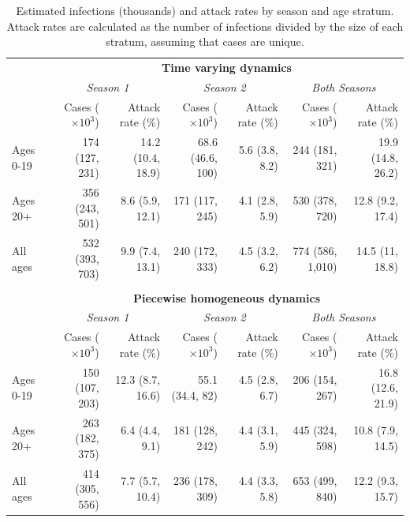 \begin{table}
	\caption[Estimated A(H1N1) infections and attack rates by season and age stratum.]{Estimated infections (thousands) and attack rates by season and age stratum. Attack rates are calculated as the number of infections divided by the size of each stratum, assuming that cases are unique.}
	\label{tab:flu_attack_rates}
	\centering\footnotesize
	\begin{tabular}{lrrrrrr}
		\hline
		&\multicolumn{6}{c}{\textbf{Time varying dynamics}}\\
		\cmidrule{2-7} & \multicolumn{2}{c}{\textit{Season 1}} & \multicolumn{2}{c}{\textit{Season 2}} & \multicolumn{2}{c}{\textit{Both Seasons}}\\
		\cmidrule(r){2-3}\cmidrule(lr){4-5}\cmidrule(l){6-7} & 
		Cases ($ \times10^3 $) & Attack rate (\%) & Cases ($ \times10^3 $)& Attack rate (\%) & Cases ($ \times10^3 $) & Attack rate (\%)\\
		\hline
	Ages 0-19 & 174 (127, 231) & 14.2 (10.4, 18.9) & 68.6 (46.6, 100) & 5.6 (3.8, 8.2) & 244 (181, 321) & 19.9 (14.8, 26.2)\\
	Ages 20+ & 356 (243, 501) & 8.6 (5.9, 12.1) & 171 (117, 245) & 4.1 (2.8, 5.9) & 530 (378, 720) & 12.8 (9.2, 17.4)\\
	All ages & 532 (393, 703) & 9.9 (7.4, 13.1) & 240 (172, 333) & 4.5 (3.2, 6.2) & 774 (586, 1,010) & 14.5 (11, 18.8)\\
		\hline &&&&&&\\
		&\multicolumn{6}{c}{\textbf{Piecewise homogeneous dynamics}}\\
		\cmidrule{2-7}	& \multicolumn{2}{c}{\textit{Season 1}} & \multicolumn{2}{c}{\textit{Season 2}} & \multicolumn{2}{c}{\textit{Both Seasons}}\\
	\cmidrule(r){2-3}\cmidrule(lr){4-5}\cmidrule(l){6-7} & 
	Cases ($ \times10^3 $) & Attack rate (\%)& Cases ($ \times10^3 $) & Attack rate (\%)& Cases ($ \times10^3 $) & Attack rate (\%)\\
	\hline
	Ages 0-19 & 150 (107, 203) & 12.3 (8.7, 16.6) & 55.1 (34.4, 82) & 4.5 (2.8, 6.7) & 206 (154, 267) & 16.8 (12.6, 21.9)\\
	Ages 20+ & 263 (182, 375) & 6.4 (4.4, 9.1) & 181 (128, 242) & 4.4 (3.1, 5.9) & 445 (324, 598) & 10.8 (7.9, 14.5)\\
	All ages & 414 (305, 556) & 7.7 (5.7, 10.4) & 236 (178, 309) & 4.4 (3.3, 5.8) & 653 (499, 840) & 12.2 (9.3, 15.7)\\
		\hline
	\end{tabular}
\end{table}

